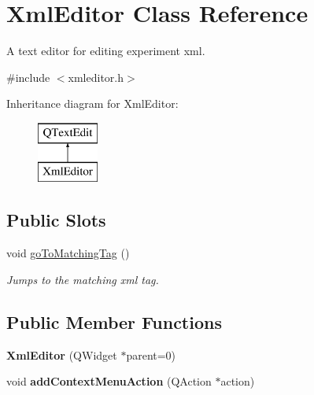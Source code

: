 \hypertarget{class_xml_editor}{\section{Xml\-Editor Class Reference}
\label{class_xml_editor}
}


A text editor for editing experiment xml.  




{\ttfamily \#include $<$xmleditor.\-h$>$}

Inheritance diagram for Xml\-Editor\-:\begin{figure}[H]
\begin{center}
\leavevmode
\includegraphics[height=2.000000cm]{class_xml_editor}
\end{center}
\end{figure}
\subsection*{Public Slots}
\begin{DoxyCompactItemize}
\item 
void \hyperlink{class_xml_editor_aa702f5077dfd13bcabfcbbcfd22bd960}{go\-To\-Matching\-Tag} ()
\begin{DoxyCompactList}\small\item\em Jumps to the matching xml tag. \end{DoxyCompactList}\end{DoxyCompactItemize}
\subsection*{Public Member Functions}
\begin{DoxyCompactItemize}
\item 
\hypertarget{class_xml_editor_a68236dafaac68603ecff70b30a2575e2}{{\bfseries Xml\-Editor} (Q\-Widget $\ast$parent=0)}\label{class_xml_editor_a68236dafaac68603ecff70b30a2575e2}

\item 
\hypertarget{class_xml_editor_a2d9422991befdcc499ef542b9120453d}{void {\bfseries add\-Context\-Menu\-Action} (Q\-Action $\ast$action)}\label{class_xml_editor_a2d9422991befdcc499ef542b9120453d}

\end{DoxyCompactItemize}
